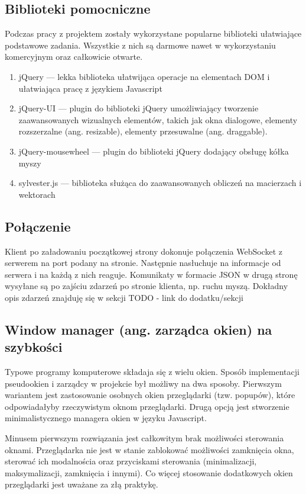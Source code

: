 \subsection{Biblioteki pomocniczne}
Podczas pracy z projektem zostały wykorzystane popularne biblioteki ułatwiające podstawowe zadania. Wszystkie z nich są darmowe nawet w wykorzystaniu komercyjnym oraz całkowicie otwarte.
\begin{enumerate}
  \item jQuery --- lekka biblioteka ułatwijąca operacje na elementach DOM i ułatwiająca pracę z językiem Javascript
  \item jQuery-UI --- plugin do biblioteki jQuery umożliwiający tworzenie zaawansowanych wizualnych elementów, takich jak okna dialogowe, elementy rozszerzalne (ang. resizable), elementy przesuwalne (ang. draggable).
  \item jQuery-mousewheel --- plugin do biblioteki jQuery dodający obsługę kółka myszy
  \item sylvester.js --- biblioteka służąca do zaawansowanych obliczeń na macierzach i wektorach
\end{enumerate}


\subsection{Połączenie}
Klient po załadowaniu początkowej strony dokonuje połączenia WebSocket z serwerem na port podany na stronie. Następnie nasłuchuje na informacje od serwera i na każdą z nich reaguje. Komunikaty w formacie JSON w drugą stronę wysyłane są po zajściu zdarzeń po stronie klienta, np. ruchu myszą. Dokładny opis zdarzeń znajduję się w sekcji TODO - link do dodatku/sekcji

\subsection{Window manager (ang. zarządca okien) na szybkości}
Typowe programy komputerowe składaja się z wielu okien. Sposób implementacji pseudookien i zarządcy w projekcie był możliwy na dwa sposoby.
Pierwszym wariantem jest zastosowanie osobnych okien przeglądarki (tzw. popupów), które odpowiadałyby rzeczywistym oknom przeglądarki.
Drugą opcją jest stworzenie minimalistycznego managera okien w języku Javascript.

Minusem pierwszym rozwiązania jest całkowitym brak możliwości sterowania oknami. Przeglądarka nie jest w stanie zablokować możliwości zamknięcia okna, sterować ich modalnościa oraz przyciskami sterowania (minimalizacji, maksymalizacji, zamknięcia i innymi). Co więcej stosowanie dodatkowych okien przeglądarki jest uważane za złą praktykę.

